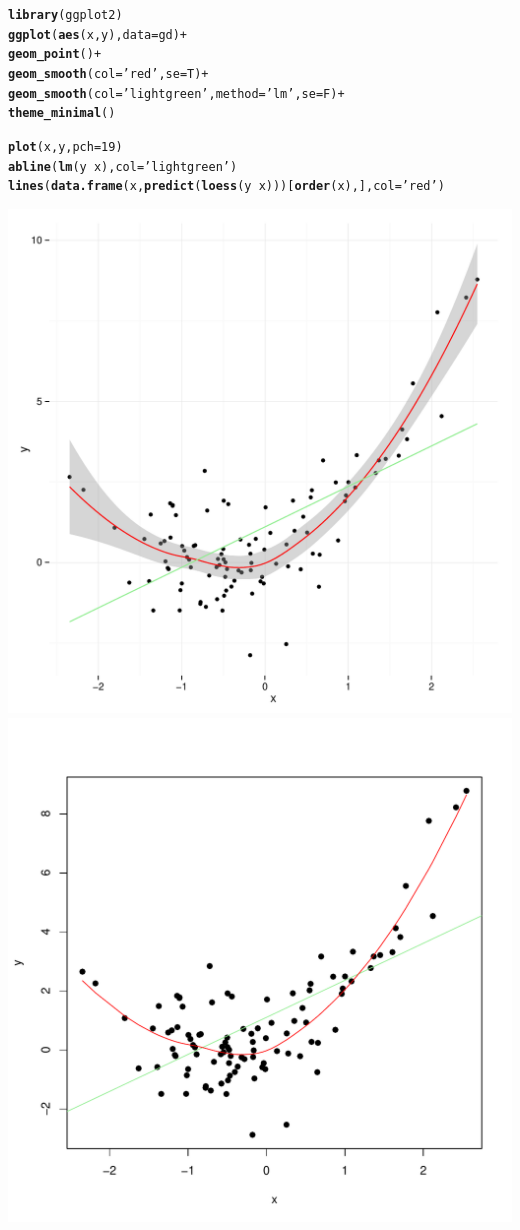 \documentclass[english,nohyper,titlepage]{tufte-handout}\usepackage[]{graphicx}\usepackage[]{color}
\makeatletter
\newcommand{\hlnum}[1]{\textcolor[rgb]{0.686,0.059,0.569}{#1}}%
\newcommand{\hlstr}[1]{\textcolor[rgb]{0.192,0.494,0.8}{#1}}%
\newcommand{\hlopt}[1]{\textcolor[rgb]{0,0,0}{#1}}%
\newcommand{\hlstd}[1]{\textcolor[rgb]{0.345,0.345,0.345}{#1}}%
\newcommand{\hlkwc}[1]{\textcolor[rgb]{0.333,0.667,0.333}{#1}}%
\newcommand{\hlkwd}[1]{\textcolor[rgb]{0.737,0.353,0.396}{\textbf{#1}}}%
\newenvironment{kframe}{%
 \def\at@end@of@kframe{}%
 \ifinner\ifhmode%
  \def\at@end@of@kframe{\end{minipage}}%
  \begin{minipage}{\columnwidth}%
 \fi\fi%
 \def\FrameCommand##1{\hskip\@totalleftmargin \hskip-\fboxsep
 \colorbox{shadecolor}{##1}\hskip-\fboxsep
     \hskip-\linewidth \hskip-\@totalleftmargin \hskip\columnwidth}%
 \MakeFramed {\advance\hsize-\width
   \@totalleftmargin\z@ \linewidth\hsize
   \@setminipage}}%
 {\par\unskip\endMakeFramed%
 \at@end@of@kframe}
\newenvironment{knitrout}{}{} %
\makeatother
\begin{document}
\begin{knitrout}\footnotesize
{}\color{fgcolor}\begin{kframe}
\begin{alltt}
\hlkwd{library}\hlstd{(ggplot2)}
\hlkwd{ggplot}\hlstd{(}\hlkwd{aes}\hlstd{(x, y),} \hlkwc{data}\hlstd{=gd)} \hlopt{+}
  \hlkwd{geom_point}\hlstd{()} \hlopt{+}
  \hlkwd{geom_smooth}\hlstd{(}\hlkwc{col}\hlstd{=}\hlstr{'red'}\hlstd{,} \hlkwc{se}\hlstd{=T)} \hlopt{+}
  \hlkwd{geom_smooth}\hlstd{(}\hlkwc{col}\hlstd{=}\hlstr{'lightgreen'}\hlstd{,} \hlkwc{method}\hlstd{=}\hlstr{'lm'}\hlstd{,} \hlkwc{se}\hlstd{=F)} \hlopt{+}
  \hlkwd{theme_minimal}\hlstd{()}

\hlkwd{plot}\hlstd{(x, y,} \hlkwc{pch}\hlstd{=}\hlnum{19}\hlstd{)}
\hlkwd{abline}\hlstd{(}\hlkwd{lm}\hlstd{(y}\hlopt{~}\hlstd{x),} \hlkwc{col}\hlstd{=}\hlstr{'lightgreen'}\hlstd{)}
\hlkwd{lines}\hlstd{(}\hlkwd{data.frame}\hlstd{(x,} \hlkwd{predict}\hlstd{(}\hlkwd{loess}\hlstd{(y}\hlopt{~}\hlstd{x)))[}\hlkwd{order}\hlstd{(x),],} \hlkwc{col}\hlstd{=}\hlstr{'red'}\hlstd{)}
\end{alltt}
\end{kframe}
\includegraphics[width=.49\linewidth]{figure/ggCarScatter1} 
\includegraphics[width=.49\linewidth]{figure/ggCarScatter2} 

\end{knitrout}
\end{document}
